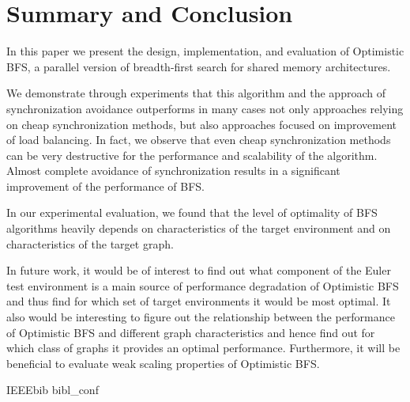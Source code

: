 \documentclass[letterpaper]{article}
\begin{document}
		
		
	\section{Summary and Conclusion}\label{sec:suco} %
		In this paper we present the design, implementation, and evaluation of Optimistic BFS, a parallel version of breadth-first search for shared memory architectures.
		
		We demonstrate through experiments that this algorithm and the approach of	 synchronization avoidance outperforms in many cases not only approaches relying on cheap synchronization methods, but also approaches focused on improvement of load balancing. 		
		In fact, we observe that even cheap synchronization methods can be very destructive for the performance and scalability of the algorithm.  
		Almost complete avoidance of synchronization results in a significant improvement of the performance of BFS. %
		
		In our experimental evaluation, we found that the level of optimality of BFS algorithms heavily depends on characteristics of the target environment and on characteristics of the target graph. %
		
		In future work, it would be of interest to find out what component of the Euler test environment is a main source of performance degradation of Optimistic BFS and thus find for which set of target environments it would be most optimal. 
		It also would be interesting to figure out the relationship between the performance of Optimistic BFS and different graph characteristics and hence find out for which class of graphs it provides an optimal performance.
		Furthermore, it will be beneficial to evaluate weak scaling properties of Optimistic BFS.
	
	 	{IEEEbib} %
	 		{bibl_conf}
\end{document}
